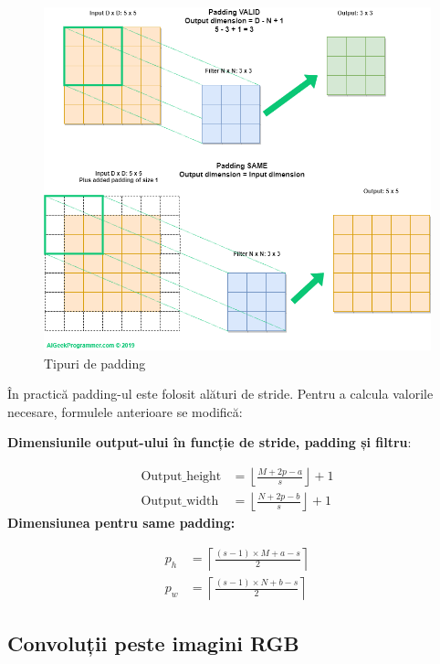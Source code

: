\begin{figure}[h]
         \centering 
         \includegraphics[width=0.75\linewidth]{images/padding.png}
         \captionsetup{font=footnotesize}
         \caption{Tipuri de padding\cite{padding}}
\end{figure}
În practică padding-ul este folosit alături de stride. Pentru a calcula valorile necesare, formulele anterioare se modifică:

\textbf{Dimensiunile output-ului în funcție de stride, padding și filtru}:

\begin{equation}
    \begin{aligned}
        \text{Output\_height} &= \left\lfloor \frac{M + 2p - a}{s} \right\rfloor + 1 \\
        \text{Output\_width} &= \left\lfloor \frac{N + 2p - b}{s} \right\rfloor + 1
    \end{aligned}
    \label{eq:output_with_padding}
\end{equation}
\newpage
\textbf{Dimensiunea pentru same padding:}

\begin{equation}
    \begin{aligned}
        p_h &= \left\lceil \frac{(s-1) \times M + a - s}{2} \right\rceil \\
        p_w &= \left\lceil \frac{(s-1) \times N + b - s}{2} \right\rceil
    \end{aligned}
\end{equation}

\subsection{Convoluții peste imagini RGB}

